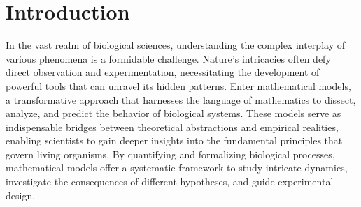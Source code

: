 
\chapter{Introduction}\label{ch:introduction}
In the vast realm of biological sciences, understanding the complex interplay of various phenomena is a formidable challenge. Nature's intricacies often defy direct observation and experimentation, necessitating the development of powerful tools that can unravel its hidden patterns. Enter mathematical models, a transformative approach that harnesses the language of mathematics to dissect, analyze, and predict the behavior of biological systems. These models serve as indispensable bridges between theoretical abstractions and empirical realities, enabling scientists to gain deeper insights into the fundamental principles that govern living organisms. By quantifying and formalizing biological processes, mathematical models offer a systematic framework to study intricate dynamics, investigate the consequences of different hypotheses, and guide experimental design. %

\lipsum[1]






